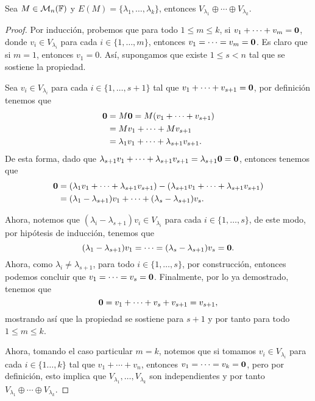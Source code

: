 \begin{teor}
  Sea $M \in \mathcal{M}_n(\mathbb{F})$ y $E(M) = \{\lambda_1, \ldots, \lambda_k\}$, entonces $V_{\lambda_1} \oplus \cdots \oplus V_{\lambda_k}$.
\end{teor}
\begin{proof}
  Por inducción, probemos que para todo $1\leq m \leq k$, si $v_1 + \cdots + v_m = \mathbf{0}$, donde $v_i \in V_{\lambda_i}$ para cada $i\in\{1,\ldots,m\}$, entonces $v_1 = \cdots = v_m = \mathbf{0}$. Es claro que si $m = 1$, entonces $v_1 = 0$. Así, supongamos que existe $1 \leq s < n$ tal que se sostiene la propiedad.

  Sea $v_i \in V_{\lambda_i}$ para cada $i\in\{1,\ldots,s+1\}$ tal que $v_1 + \cdots+ v_{s+1} = \mathbf{0}$, por definición tenemos que
  \begin{align*}
    \mathbf{0} &= M\mathbf{0} = M(v_1 + \cdots+ v_{s+1}) \\
      &= Mv_1 + \cdots+ Mv_{s+1} \\
      &= \lambda_1v_1 + \cdots+ \lambda_{s+1}v_{s+1}.
  \end{align*}
  De esta forma, dado que $\lambda_{s+1} v_1 + \cdots+ \lambda_{s+1} v_{s+1} = \lambda_{s+1}\mathbf{0} = \mathbf{0}$, entonces tenemos que 
    \begin{align*}
      \mathbf{0} &= (\lambda_1v_1 + \cdots+ \lambda_{s+1}v_{s+1}) - (\lambda_{s+1} v_1 + \cdots+ \lambda_{s+1} v_{s+1}) \\
        &= (\lambda_1 - \lambda_{s+1})v_1 + \cdots + (\lambda_s - \lambda_{s+1})v_s.
    \end{align*}
  
    Ahora, notemos que $(\lambda_i - \lambda_{s+1})v_{i} \in V_{\lambda_i}$ para cada $i \in \{1,\ldots,s\}$, de este modo, por hipótesis de inducción, tenemos que
      \[ (\lambda_1 - \lambda_{s+1})v_1 = \cdots = (\lambda_s - \lambda_{s+1})v_s = \mathbf{0}.\]
    Ahora, como  $\lambda_i \neq \lambda_{s+1}$, para todo $i \in \{1,\ldots,s\}$, por construcción, entonces podemos concluir que $v_1 = \cdots = v_s = \mathbf{0}$. Finalmente, por lo ya demostrado, tenemos que 
      \[ \mathbf{0} = v_1 + \cdots+ v_s + v_{s+1} = v_{s+1}, \]
    mostrando así que la propiedad se sostiene para $s+1$ y por tanto para todo $1 \leq m \leq k$.

    Ahora, tomando el caso particular $m = k$, notemos que si tomamos $v_i \in V_{\lambda_i}$ para cada $i \in \{1\ldots,k\}$ tal que $v_1 + \cdots + v_n$, entonces $v_1 = \cdots = v_k = \mathbf{0}$, pero por definición, esto implica que $V_{\lambda_1}, \ldots, V_{\lambda_k}$ son independientes y por tanto $V_{\lambda_1} \oplus \cdots \oplus V_{\lambda_k}$.
\end{proof}